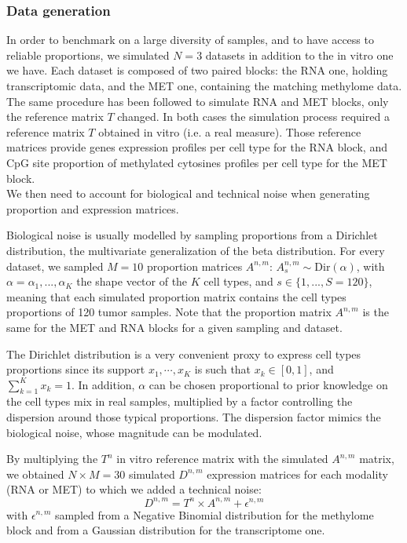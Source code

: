 \documentclass{article}
\begin{document}
\subsubsection{Data generation}\label{subsubsec:data-generation}

In order to benchmark on a large diversity of samples, and to have access to reliable  proportions, we simulated $N=3$ datasets in addition to the in vitro one we have.
Each dataset is composed of two paired blocks: the RNA one, holding transcriptomic data, and the MET one, containing the matching methylome data. \\

The same procedure has been followed to simulate RNA and MET blocks, only the reference matrix $T$ changed.
In both cases the simulation process required a reference matrix $T$ obtained in vitro (i.e. a real measure).
Those reference matrices provide genes expression profiles per cell type for the RNA block, and CpG site proportion of methylated cytosines profiles per cell type for the MET block. \\

We then need to account for biological and technical noise when generating proportion and expression matrices.

Biological noise is usually modelled by sampling proportions from a Dirichlet distribution, the multivariate generalization of the beta distribution.
For every dataset, we sampled $M=10$ proportion matrices $A^{n,m}$: $A^{n,m}_{s} \sim \text{Dir}(\alpha)$, with $\alpha = \alpha_1, ..., \alpha_K$ the shape vector of the $K$ cell types, and $s \in \{1,...,S=120\}$, meaning that each simulated proportion matrix contains the cell types proportions of 120 tumor samples.
Note that the proportion matrix $A^{n,m}$ is the same for the MET and RNA blocks for a given sampling and dataset.

The Dirichlet distribution is a very convenient proxy to express cell types proportions since its support $x_1, \cdots, x_K$ is such that $x_k \in [0,1]$, and $\sum_{k=1}^K x_k = 1$.
In addition, $\alpha$ can be chosen proportional to prior knowledge on the cell types mix in real samples, multiplied by a factor controlling the dispersion around those typical proportions. 
The dispersion factor mimics the biological noise, whose magnitude can be modulated.

By multiplying the $T^n$ in vitro reference matrix with the simulated $A^{n,m}$ matrix, we obtained $N\times M=30$ simulated $D^{n,m}$ expression matrices for each modality (RNA or MET) to which we added a technical noise:
$$D^{n,m} = T^{n} \times A^{n,m} + \epsilon^{n,m}$$
with $\epsilon^{n,m}$ sampled from a Negative Binomial distribution for the methylome block and from a Gaussian distribution for the transcriptome one.
\end{document}
